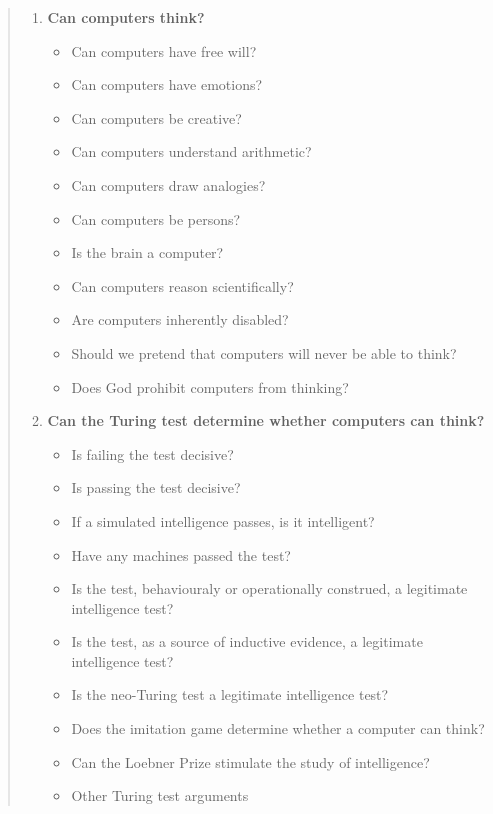 \noindent
\begin{quotation}
  \begin{enumerate}
    \item \textbf{Can computers think?}
      \begin{itemize}
        \item Can computers have free will?
        \item Can computers have emotions?
        \item Can computers be creative?
        \item Can computers understand arithmetic?
        \item Can computers draw analogies?
        \item Can computers be persons?
        \item Is the brain a computer?
        \item Can computers reason scientifically?
        \item Are computers inherently disabled?
        \item Should we pretend that computers will never be able to think?
        \item Does God prohibit computers from thinking?
      \end{itemize}
    \item \textbf{Can the Turing test determine whether computers can think?}
      \begin{itemize}
        \item Is failing the test decisive?
        \item Is passing the test decisive?
        \item If a simulated intelligence passes, is it intelligent?
        \item Have any machines passed the test?
        \item Is the test, behaviouraly or operationally construed, a legitimate intelligence test?
        \item Is the test, as a source of inductive evidence, a legitimate intelligence test?
        \item Is the neo-Turing test a legitimate intelligence test?
        \item Does the imitation game determine whether a computer can think?
        \item Can the Loebner Prize stimulate the study of intelligence?
        \item Other Turing test arguments
      \end{itemize}

\end{enumerate}
\end{quotation}
